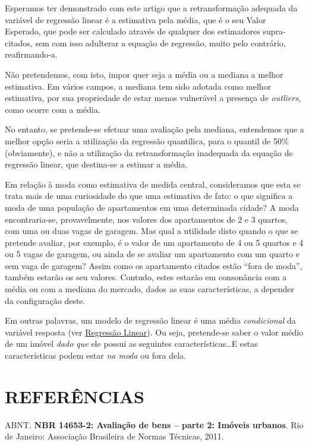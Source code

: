 \documentclass[a4paper]{article}
\begin{document}
Esperamos ter demonstrado com este artigo que a retransformação adequada
da variável de regressão linear é a estimativa pela média, que é o seu
Valor Esperado, que pode ser calculado através de qualquer dos
estimadores supra-citados, sem com isso adulterar a equação de
regressão, muito pelo contrário, reafirmando-a.

Não pretendemos, com isto, impor quer seja a média ou a mediana a melhor
estimativa. Em vários campos, a mediana tem sido adotada como melhor
estimativa, por sua propriedade de estar menos vulnerável a presença de
\emph{outliers}, como ocorre com a média.

No entanto, se pretende-se efetuar uma avaliação pela mediana,
entendemos que a melhor opção seria a utilização da regressão
quantílica, para o quantil de 50\% (obviamente), e não a utilização da
retransformação inadequada da equação de regressão linear, que
destina-se a estimar a média.

Em relação à moda como estimativa de medida central, consideramos que
esta se trata mais de uma curiosidade do que uma estimativa de fato: o
que significa a moda de uma população de apartamentos em uma determinada
cidade? A moda encontraria-se, provavelmente, nos valores dos
apartamentos de 2 e 3 quartos, com uma ou duas vagas de garagem. Mas
qual a utilidade disto quando o que se pretende avaliar, por exemplo, é
o valor de um apartamento de 4 ou 5 quartos e 4 ou 5 vagas de garagem,
ou ainda de se avaliar um apartamento com um quarto e sem vaga de
garagem? Assim como os apartamento citados estão ``fora de moda'',
também estarão os seu valores. Contudo, estes estarão em consonância com
a média ou com a mediana do mercado, dados as suas características, a
depender da configuração deste.

Em outras palavras, um modelo de regressão linear é uma média
\emph{condicional} da variável resposta (ver
\protect\hyperlink{regressao-linear}{Regressão Linear}). Ou seja,
pretende-se saber o valor médio de um imóvel \emph{dado que} ele possui
as seguintes características\ldots{}E estas características podem estar
\emph{na moda} ou fora dela.

\section*{REFERÊNCIAS}\label{referencias}

\hypertarget{refs}{}
\hypertarget{ref-NBR1465302}{}
ABNT. \textbf{NBR 14653-2: Avaliação de bens -- parte 2: Imóveis
urbanos}. Rio de Janeiro: Associação Brasileira de Normas Técnicas,
2011.
\end{document}
